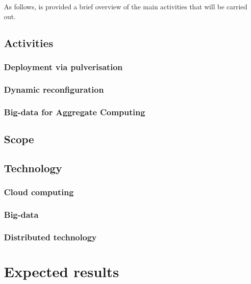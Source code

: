 \documentclass[12pt]{article}
\newcommand{\meta}[1]{{\color{blue}#1}}
\begin{document}
As follows, is provided a brief overview of the main activities that will be carried out.

\subsection{Activities}\label{subsec:activities}

\meta{
\subsubsection*{Deployment via pulverisation}

\subsubsection*{Dynamic reconfiguration}

\subsubsection*{Big-data for Aggregate Computing}
}

\subsection{Scope}\label{subsec:scope}

\subsection{Technology}\label{subsec:technology}

\meta{
\subsubsection*{Cloud computing}
\subsubsection*{Big-data}
\subsubsection*{Distributed technology}
}

\section{Expected results}\label{sec:expected-results}
\end{document}
